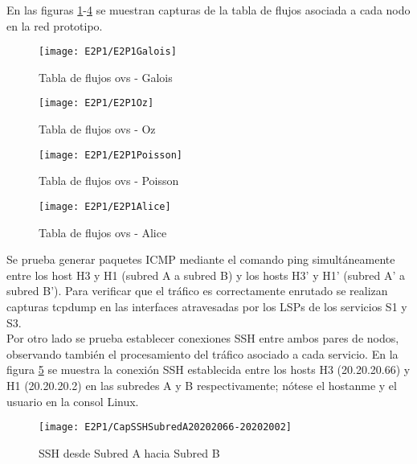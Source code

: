 En las figuras \ref{fig:CU2P1DumpFlows1}-\ref{fig:CU2P1DumpFlows4} se muestran capturas de la tabla de flujos asociada a cada nodo en la red prototipo.

\begin{figure}[ht!] 
\centering    
\texttt{[image: E2P1/E2P1Galois]}
\caption[Tabla de flujos ovs - Galois]{Tabla de flujos ovs - Galois}
\label{fig:CU2P1DumpFlows1}
\end{figure}

\begin{figure}[h!] 
\centering    
\texttt{[image: E2P1/E2P1Oz]}
\caption[Tabla de flujos ovs - Oz]{Tabla de flujos ovs - Oz}
\label{fig:CU2P1DumpFlows2}
\end{figure}

\begin{figure}[h!] 
\centering    
\texttt{[image: E2P1/E2P1Poisson]}
\caption[Tabla de flujos ovs - Poisson]{Tabla de flujos ovs - Poisson}
\label{fig:CU2P1DumpFlows3}
\end{figure}

\begin{figure}[h!] 
\centering    
\texttt{[image: E2P1/E2P1Alice]}
\caption[Tabla de flujos ovs - Alice]{Tabla de flujos ovs - Alice}
\label{fig:CU2P1DumpFlows4}
\end{figure}

\newpage
Se prueba generar paquetes ICMP mediante el comando ping simultáneamente entre los host H3 y H1 (subred A a subred B) y los hosts H3' y H1' (subred A' a subred B'). Para verificar que el tr\'afico es correctamente enrutado se realizan capturas tcpdump en las interfaces atravesadas por los LSPs de los servicios S1 y S3.\\

Por otro lado se prueba establecer conexiones SSH entre ambos pares de nodos, observando tambi\'en el procesamiento del tr\'afico asociado a cada servicio. En la figura \ref{fig:CapSSHSASB} se muestra la conexi\'on SSH establecida entre los hosts H3 (20.20.20.66) y H1 (20.20.20.2) en las subredes A y B respectivamente; n\'otese el hostanme y el usuario en la consol Linux.

\begin{figure}[h!] 
\centering    
\texttt{[image: E2P1/CapSSHSubredA20202066-20202002]}
\caption[SSH desde Subred A hacia Subred B]{SSH desde Subred A hacia Subred B}
\label{fig:CapSSHSASB}
\end{figure}

